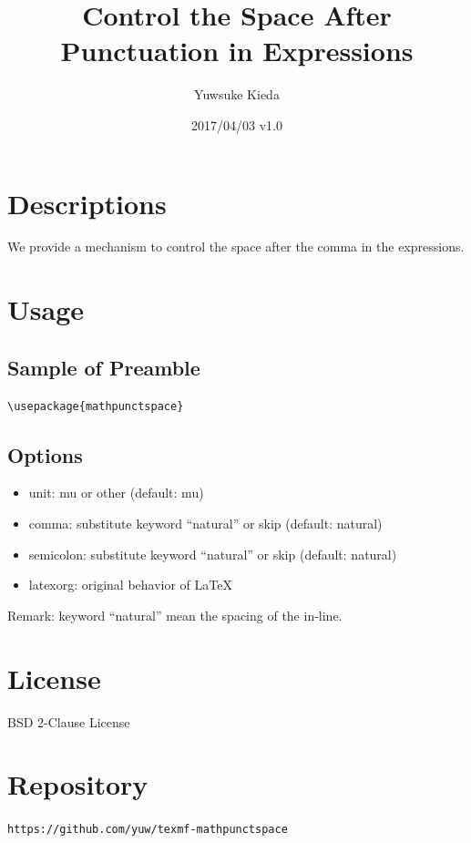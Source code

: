 \documentclass{article}
\title{Control the Space After Punctuation in Expressions}
\author{Yuwsuke Kieda}
\date{2017/04/03 v1.0}
\begin{document}
\maketitle

\section{Descriptions}

We provide a mechanism to control the space after the comma in the expressions.

\section{Usage}

\subsection{Sample of Preamble}

\begin{verbatim}
\usepackage{mathpunctspace}
\end{verbatim}

\subsection{Options}

\begin{itemize}
 \item unit: mu or other (default: mu)
 \item comma: substitute keyword ``natural'' or skip (default: natural)
 \item semicolon: substitute keyword ``natural'' or skip (default: natural)
 \item latexorg: original behavior of LaTeX
\end{itemize}

Remark: keyword ``natural'' mean the spacing of the in-line.

\section{License}

BSD 2-Clause License

\section{Repository}

\texttt{https://github.com/yuw/texmf-mathpunctspace}
\end{document}
